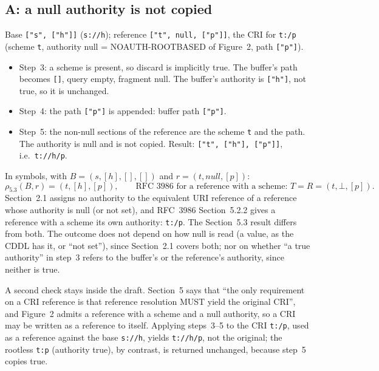 \documentclass[11pt,a4paper]{article}
\theoremstyle{remark}
\newcommand{\cri}[1]{\texttt{#1}}
\newcommand{\uri}[1]{\texttt{#1}}
\newcommand{\res}{\rho_{5.3}}
\newcommand{\seq}[1]{[#1]}
\begin{document}
\subsection{A: a null authority is not copied}
Base \cri{["s", ["h"]]} (\uri{s://h}); reference \cri{["t", null, ["p"]]}, the CRI for \uri{t:/p}
(scheme \cri{t}, authority null = NOAUTH-ROOTBASED of Figure~2, path \cri{["p"]}).
\begin{itemize}[nosep]
\item Step~3: a scheme is present, so discard is implicitly true. The buffer's path becomes \cri{[]},
query empty, fragment null. The buffer's authority is \cri{["h"]}, not true, so it is unchanged.
\item Step~4: the path \cri{["p"]} is appended: buffer path \cri{["p"]}.
\item Step~5: the non-null sections of the reference are the scheme \cri{t} and the path. The authority
is null and is not copied. Result: \cri{["t", ["h"], ["p"]]}, i.e.\ \uri{t://h/p}.
\end{itemize}
In symbols, with $B=(\mathit{s},\seq{h},\seq{},\seq{})$ and $r=(\mathit{t},\mathit{null},\seq{p})$:
\[
\res(B,r)=(\mathit{t},\seq{h},\seq{p}),\qquad\text{RFC 3986 for a reference with a scheme: } T=R=(\mathit{t},\bot,\seq{p}).
\]
Section~2.1 assigns no authority to the equivalent URI reference of a reference whose authority is null
(or not set), and RFC~3986 Section~5.2.2 gives a reference with a scheme its own authority: \uri{t:/p}.
The Section~5.3 result differs from both. The outcome does not depend on how null is read (a value, as
the CDDL has it, or ``not set''), since Section~2.1 covers both; nor on whether ``a true authority'' in
step~3 refers to the buffer's or the reference's authority, since neither is true.

A second check stays inside the draft. Section~5 says that ``the only requirement on a CRI reference is
that reference resolution MUST yield the original CRI'', and Figure~2 admits a reference with a scheme and
a null authority, so a CRI may be written as a reference to itself. Applying steps~3--5 to the CRI
\uri{t:/p}, used as a reference against the base \uri{s://h}, yields \uri{t://h/p}, not the original;
the rootless \uri{t:p} (authority true), by contrast, is returned unchanged, because step~5 copies true.
\end{document}
